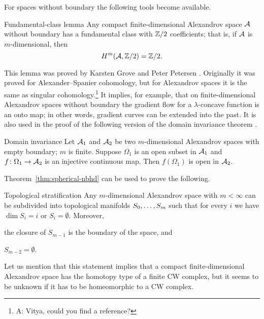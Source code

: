 For spaces without boundary the following tools become available.

\begin{thm}{Fundamental-class lemma}\label{lem:fund-class}
Any compact finite-dimensional Alexandrov space $\mathcal{A}$ without boundary has a fundamental class with $\mathbb{Z}/2$ coefficients;
that is, if $\mathcal{A}$ is $m$-dimensional, then
\[H^m(\mathcal{A},\mathbb{Z}/2)=\mathbb{Z}/2.\]

\end{thm}

This lemma was proved by Karsten Grove and Peter Petersen \cite{grove-petersen}.
Originally it was proved for Alexander--Spanier cohomology, but for Alexandrov spaces it is the same as singular cohomology.\footnote{{\red A: Vitya, could you find a reference?}}
It implies, for example, that on finite-dimensional Alexandrov spaces without boundary 
the gradient flow for a $\lambda$-concave function is an onto map;
in other words, gradient curves can be extended into the past.
It is also used in the proof of the following version of the domain invariance theorem \cite[Theorem 3.2]{kapovitch-zhu}.

\begin{thm}{Domain invariance}\label{thm-inv-domain}
Let $\mathcal{A}_1$ and $\mathcal{A}_2$ be two $m$-dimensional Alexandrov spaces with empty boundary; $m$ is finite.
Suppose $\Omega_1$ is an open subset in $\mathcal{A}_1$ and $f\colon\Omega_1\to \mathcal{A}_2$ is an injective continuous map.
Then $f(\Omega_1)$ is open in $\mathcal{A}_2$.
\end{thm}

Theorem~\ref{thm:spherical-nbhd} can be used to prove the following. 

\begin{thm}{Topological stratification}\label{thm:top-stratification}
Any $m$-dimensional Alexandrov space with $m<\infty$ can be subdivided into topological manifolds $S_0,\dots,S_m$ such that for every $i$ we have $\dim S_i=i$ or $S_i=\emptyset$.
Moreover,
\begin{subthm}{}
the closure of $S_{m-1}$ is the boundary of the space, and
\end{subthm}

\begin{subthm}{}
$S_{m-2}=\emptyset$.
\end{subthm}

\end{thm}

Let us mention that this statement implies that a compact finite-dimensional Alexandrov space has the homotopy type of a finite CW complex,
but it seems to be unknown if it has to be homeomorphic to a CW complex.

